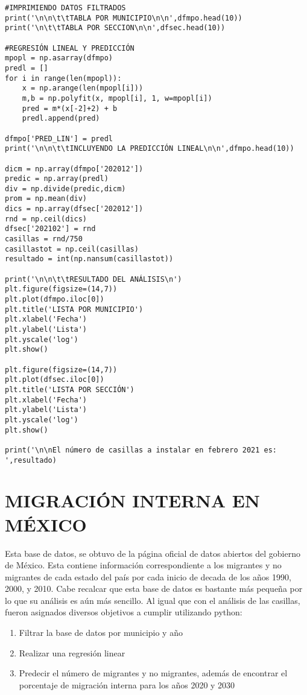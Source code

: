 \documentclass[12pt]{article}
\begin{document}
\begin{verbatim}
#IMPRIMIENDO DATOS FILTRADOS
print('\n\n\t\tTABLA POR MUNICIPIO\n\n',dfmpo.head(10))
print('\n\t\tTABLA POR SECCION\n\n',dfsec.head(10))

#REGRESIÓN LINEAL Y PREDICCIÓN
mpopl = np.asarray(dfmpo)
predl = []
for i in range(len(mpopl)):
    x = np.arange(len(mpopl[i]))
    m,b = np.polyfit(x, mpopl[i], 1, w=mpopl[i])
    pred = m*(x[-2]+2) + b
    predl.append(pred)

dfmpo['PRED_LIN'] = predl
print('\n\n\t\tINCLUYENDO LA PREDICCIÓN LINEAL\n\n',dfmpo.head(10))

dicm = np.array(dfmpo['202012'])
predic = np.array(predl)
div = np.divide(predic,dicm)
prom = np.mean(div)
dics = np.array(dfsec['202012'])
rnd = np.ceil(dics)
dfsec['202102'] = rnd
casillas = rnd/750
casillastot = np.ceil(casillas)
resultado = int(np.nansum(casillastot))

print('\n\n\t\tRESULTADO DEL ANÁLISIS\n')
plt.figure(figsize=(14,7))
plt.plot(dfmpo.iloc[0])
plt.title('LISTA POR MUNICIPIO')
plt.xlabel('Fecha')
plt.ylabel('Lista')
plt.yscale('log')
plt.show()

plt.figure(figsize=(14,7))
plt.plot(dfsec.iloc[0])
plt.title('LISTA POR SECCIÓN')
plt.xlabel('Fecha')
plt.ylabel('Lista')
plt.yscale('log')
plt.show()

print('\n\nEl número de casillas a instalar en febrero 2021 es: ',resultado) 
\end{verbatim}

\section{\large MIGRACIÓN INTERNA EN MÉXICO}
Esta base de datos, se obtuvo de la página oficial de datos abiertos del gobierno de México. Esta contiene información correspondiente a los migrantes y no migrantes de cada estado del país por cada inicio de decada de los años 1990, 2000, y 2010. Cabe recalcar que esta base de datos es bastante más pequeña por lo que su análisis es aún más sencillo. Al igual que con el análisis de las casillas, fueron asignados diversos objetivos a cumplir utilizando python:

\begin{enumerate}
	\item Filtrar la base de datos por municipio y año
	\item Realizar una regresión linear
	\item Predecir el número de migrantes y no migrantes, además de encontrar el porcentaje de migración interna para los años 2020 y 2030
\end{enumerate}
\end{document}
